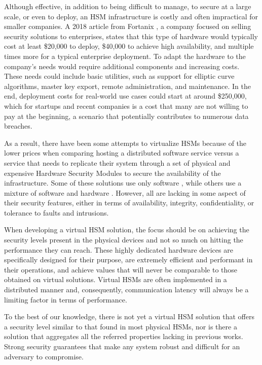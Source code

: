 Although effective, in addition to being difficult to manage, to secure at a large scale, or even to deploy, an HSM infrastructure is costly and often impractical for smaller companies. A 2018 article from Fortanix \cite{hsmeconomics}, a company focused on selling security solutions to enterprises, states that this type of hardware would typically cost at least \$20,000 to deploy, \$40,000 to achieve high availability, and multiple times more for a typical enterprise deployment. To adapt the hardware to the company's needs would require additional components and increasing costs. These needs could include basic utilities, such as support for elliptic curve algorithms, master key export, remote administration, and maintenance. In the end, deployment costs for real-world use cases could start at around \$250,000, which for startups and recent companies is a cost that many are not willing to pay at the beginning, a scenario that potentially contributes to numerous data breaches.

As a result, there have been some attempts to virtualize HSMs because of the lower prices when comparing hosting a distributed software service versus a service that needs to replicate their system through a set of physical and expensive Hardware Security Modules to secure the availability of the infrastructure. Some of these solutions use only software \cite{softhsm,pmhsm}, while others use a mixture of software and hardware \cite{rosahsmthesis}. However, all are lacking in some aspect of their security features, either in terms of availability, integrity, confidentiality, or tolerance to faults and intrusions.

When developing a virtual HSM solution, the focus should be on achieving the security levels present in the physical devices and not so much on hitting the performance they can reach. These highly dedicated hardware devices are specifically designed for their purpose, are extremely efficient and performant in their operations, and achieve values that will never be comparable to those obtained on virtual solutions. Virtual HSMs are often implemented in a distributed manner and, consequently, communication latency will always be a limiting factor in terms of performance.

To the best of our knowledge, there is not yet a virtual HSM solution that offers a security level similar to that found in most physical HSMs, nor is there a solution that aggregates all the referred properties lacking in previous works. Strong security guarantees that make any system robust and difficult for an adversary to compromise.


